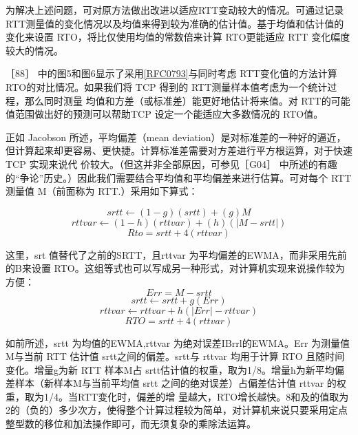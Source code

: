 为解决上述问题，可对原方法做出改进以适应RTT变动较大的情况。可通过记录 RTT测量值的变化情况以及均值来得到较为准确的估计值。基于均值和估计值的变化来设置
RTO，将比仅使用均值的常数倍来计算 RTO更能适应 RTT 变化幅度较大的情况。

［88］ 中的图5和图6显示了采用\href{https://www.rfc-editor.org/rfc/rfc0793}{[RFC0793]}与同时考虑 RTT变化值的方法计算 RTO的对比情况。如果我们将 TCP 得到的 RTT测量样本值考虑为一个统计过程，那么同时测量
均值和方差（或标准差）能更好地估计将来值。对 RTT的可能值范围做出好的预测可以帮助TCP 设定一个能适应大多数情况的 RTO值。

正如 Jacobson 所述，平均偏差（mean deviation）是对标准差的一种好的逼近，但计算起来却更容易、更快捷。计算标准差需要对方差进行平方根运算，对于快速 TCP 实现来说代
价较大。（但这并非全部原因，可参见［G04］ 中所述的有趣的“争论”历史。）因此我们需要结合平均值和平均偏差来进行估算。可对每个 RTT 测量值 M（前面称为 RTT.）采用如下算式：

\begin{equation}
    srtt \leftarrow (1-g)(srtt) + (g)M
\end{equation}
\begin{equation}
    rttvar \leftarrow (1-h)(rttvar) + (h)(|M-srtt|)    
\end{equation}
\begin{equation}
    Rto = srtt + 4(rttvar)
\end{equation}

这里，srt 值替代了之前的SRTT，且rttvar 为平均偏差的EWMA，而非采用先前的B来设置 RTO。这组等式也可以写成另一种形式，对计算机实现来说操作较为方便：
\begin{equation}
    Err = M - srtt
\end{equation}
\begin{equation}
    srtt \leftarrow srtt + g(Err)
\end{equation}
\begin{equation}
    rttvar \leftarrow rttvar + h(|Err| - rttvar)
\end{equation}
\begin{equation}
    RTO = srtt + 4(rttvar)
\end{equation}

如前所述，srtt 为均值的EWMA,rttvar 为绝对误差IBrrl的EWMA。Err 为测量值 M与当前 RTT 估计值 srtt之间的偏差。srtt与 rttvar 均用于计算 RTO 且随时间变化。增量g为新
RTT 样本M占 srtt估计值的权重，取为1/8。增量h为新平均偏差样本（新样本M与当前平均值 srtt 之间的绝对误差）占偏差估计值 rttvar 的权重，取为1/4。当RTT变化时，偏差的增
量越大，RTO增长越快。8和及的值取为2的（负的）多少次方，使得整个计算过程较为简单，对计算机来说只要采用定点整型数的移位和加法操作即可，而无须复杂的乘除法运算。

